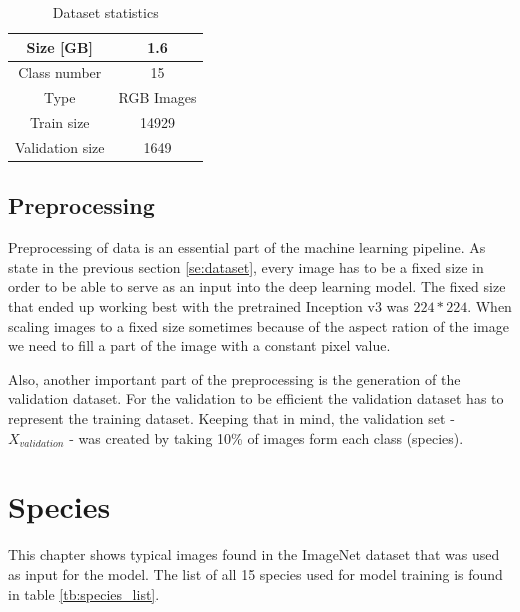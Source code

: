 \documentclass[times, utf8, diplomski]{fer}
\begin{document}
\begin{table}
\centering
\caption{Dataset statistics}
\label{tb:dataset_statistics}
\begin{tabular}{cc}
\hline 
Size [GB] & 1.6 \\ \hline 
Class number & 15 \\ 
Type & RGB Images \\ 
Train size & 14929 \\
Validation size & 1649 \\
\hline 
\end{tabular} 
\end{table}

\subsection{Preprocessing}
Preprocessing of data is an essential part of the machine learning pipeline. As state in the previous section \ref{se:dataset}, every image has to be a fixed size in order to be able to serve as an input into the deep learning model. The fixed size that ended up working best with the pretrained Inception v3 was $224 * 224$. When scaling images to a fixed size sometimes because of the aspect ration of the image we need to fill a part of the image with a constant pixel value.


Also, another important part of the preprocessing is the generation of the validation dataset. For the validation to be efficient the validation dataset has to represent the training dataset. Keeping that in mind, the validation set - $X_{validation}$ - was created by taking 10\% of images form each class (species).


\section{Species}
\label{se:species}

This chapter shows typical images found in the ImageNet dataset that was used as input for the model. The list of all 15 species used for model training is found in table \ref{tb:species_list}.
\end{document}
